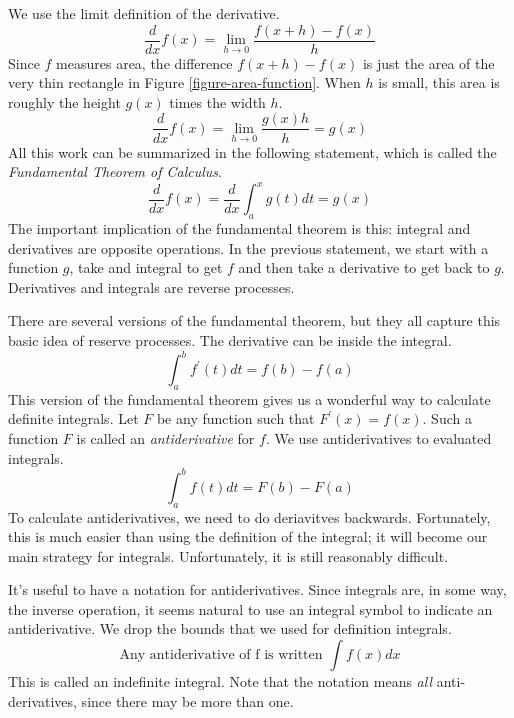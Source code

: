 \documentclass[fleqn]{report}
\begin{document}
We use the limit definition of the derivative.
\begin{equation*}
\frac{d}{dx} f(x) = \lim_{h \rightarrow 0} \frac{f(x+h) - f(x)}{h}
\end{equation*}
Since $f$ measures area, the difference $f(x+h) - f(x)$ is just
the area of the very thin rectangle in Figure
\ref{figure-area-function}.  When $h$ is small, this area is roughly
the height $g(x)$ times the width $h$.
\begin{equation*}
\frac{d}{dx} f(x) = \lim_{h \rightarrow 0} \frac{g(x) h}{h} =
g(x)
\end{equation*}
All this work can be summarized in the following statement,
which is called the \emph{Fundamental Theorem of Calculus}.
\begin{equation*}
\frac{d}{dx} f(x) = \frac{d}{dx} \int_a^x g(t) dt = g(x) 
\end{equation*}
The important implication of the fundamental theorem is this:
integral and derivatives are opposite operations. In the
previous statement, we start with a function $g$, take and
integral to get $f$ and then take a derivative to get back to
$g$. Derivatives and integrals are reverse
processes.

There are several versions of the fundamental theorem, but
they all capture this basic idea of reserve processes. The
derivative can be inside the integral.
\begin{equation*}
\int_a^b f^\prime(t) dt = f(b) - f(a) 
\end{equation*}
This version of the fundamental theorem gives us a wonderful
way to calculate definite integrals. Let $F$ be any function
such that $F^\prime(x) = f(x)$. Such a function $F$ is called an
\emph{antiderivative} for $f$. We use antiderivatives to
evaluated integrals.
\begin{equation*}
\int_a^b f(t) dt = F(b) - F(a) 
\end{equation*}
To calculate antiderivatives, we need to do deriavitves
backwards. Fortunately, this is much easier than using the
definition of the integral; it will become our main strategy
for integrals. Unfortunately, it is still reasonably
difficult.

It's useful to have a notation for antiderivatives. Since
integrals are, in some way, the inverse operation, it seems
natural to use an integral symbol to indicate an
antiderivative. We drop the bounds that we used for
definition integrals.
\begin{equation*}
\text{Any antiderivative of f is written } \int f(x) dx
\end{equation*} 
This is called an indefinite integral. Note that the notation
means \emph{all} anti-derivatives, since there may be more
than one.
\end{document}
